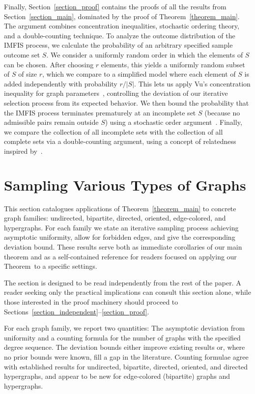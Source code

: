 \documentclass{article}
\theoremstyle{plain}
\theoremstyle{remark}
\theoremstyle{plain}
\numberwithin{equation}{section}
\begin{document}
	Finally, Section~\ref{section_proof} contains the proofs of all the results from Section~\ref{section_main}, dominated by the proof of Theorem~\ref{theorem_main}. The argument combines concentration inequalities, stochastic ordering theory, and a double-counting technique. To analyze the outcome distribution of the IMFIS process, we calculate the probability of an arbitrary specified sample outcome set $S$. We consider a uniformly random order in which the elements of $S$ can be chosen. After choosing $r$ elements, this yields a uniformly random subset of $S$ of size $r$, which we compare to a simplified model where each element of $S$ is added independently with probability $r/|S|$. This lets us apply Vu's concentration inequality for graph parameters~\cite{Vu}, controlling the deviation of our iterative selection process from its expected behavior. We then bound the probability that the IMFIS process terminates prematurely at an incomplete set $S$ (because no admissible pairs remain outside $S$) using a stochastic order argument~\cite{BookSO}. Finally, we compare the collection of all incomplete sets with the collection of all complete sets via a double-counting argument, using a concept of relatedness inspired by~\cite{MCKAY2003273}.
	
	
	
	
	\section{Sampling Various Types of Graphs}\label{section_results}
	This section catalogues applications of Theorem~\ref{theorem_main} to concrete 
	graph families: undirected, bipartite, directed, oriented, edge-colored, and hypergraphs. For each family we state an iterative sampling process achieving asymptotic uniformity, allow for forbidden edges, and give the corresponding 
	deviation bound. These results serve both as immediate corollaries of our main theorem and as a self-contained reference for readers focused on applying our Theorem~to a specific settings.
	
	The section is designed to be read independently from the rest of the paper. A reader seeking only the practical implications can consult this section alone, while those interested in the proof machinery should proceed to Sections~\ref{section_independent}--\ref{section_proof}.
	
	For each graph family, we report two quantities: The asymptotic deviation from uniformity and a counting formula for the number of graphs with the specified degree sequence. The deviation bounds either improve existing results or, where no prior bounds were known, fill a gap in the literature. Counting formulae agree with established results for undirected, bipartite, directed, oriented, and directed hypergraphs, and appear to be new for edge-colored (bipartite) graphs and hypergraphs.
	
\end{document}
